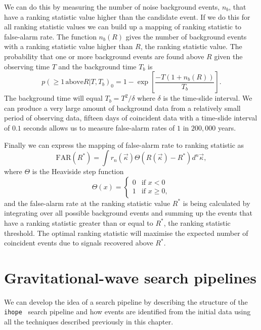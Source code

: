 We can do this by measuring the number of noise background events, $n_{b}$, that have a ranking statistic value higher than the candidate event. If we do this for all ranking statistic values we can build up a mapping of ranking statistic to false-alarm rate. The function $n_{b}(R)$ gives the number of background events with a ranking statistic value higher than $R$, the ranking statistic value. The probability that one or more background events are found above $R$ given the observing time $T$ and the background time $T_{b}$ is~\cite{PyCBC:2016}
%
\begin{equation}
    p(\ge 1 \, \text{above} R|T, T_{b})_{0} = 1 - \exp \left[\frac{-T(1 + n_{b}(R))}{T_{b}}\right].
\end{equation}
%
The background time will equal $T_{b} = T^{2}/\delta$ where $\delta$ is the time-slide interval. We can produce a very large amount of background data from a relatively small period of observing data, fifteen days of coincident data with a time-slide interval of $0.1$ seconds allows us to measure false-alarm rates of $1$ in $200,000$ years.

Finally we can express the mapping of false-alarm rate to ranking statistic as
%
\begin{equation}
    \text{FAR}(R^{*}) = \int r_{n}(\vec{\kappa}) \Theta(R(\vec{\kappa}) - R^{*}) d^{n}\vec{\kappa},
    \label{2:eq:far_mapping}
\end{equation}
%
where $\Theta$ is the Heaviside step function
%
\begin{equation}
    \Theta(x) =
    \begin{cases} 
        0 & \text{if } x < 0 \\
        1 & \text{if } x \geq 0,
    \end{cases}
\end{equation}
%
and the false-alarm rate at the ranking statistic value $R^{*}$ is being calculated by integrating over all possible background events and summing up the events that have a ranking statistic greater than or equal to $R^{*}$, the ranking statistic threshold. The optimal ranking statistic will maximise the expected number of coincident events due to signals recovered above $R^{*}$.

\section{\label{2:sec:gw-pipelines}Gravitational-wave search pipelines}

We can develop the idea of a \gwadj search pipeline by describing the structure of the \verb|ihope|~\cite{IHOPE:2012zx} search pipeline and how \gwadj events are identified from the initial \gwadj data using all the techniques described previously in this chapter.

